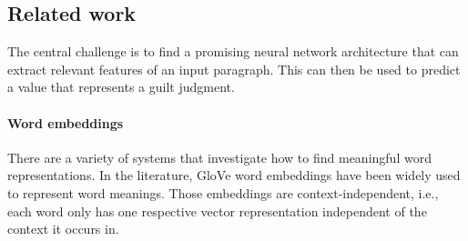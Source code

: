 \documentclass[11pt,a4paper]{article}
\begin{document}



\subsection{Related work}

The central challenge is to find a promising neural network architecture that can extract relevant features of an input paragraph. This can then be used to predict a value that represents a guilt judgment.

\paragraph{Word embeddings}
There are a variety of systems that investigate how to find meaningful word representations. In the literature, GloVe word embeddings \citep{Pennington:2014} have been widely used to represent word meanings. Those embeddings are context-independent, i.e., each word only has one respective vector representation independent of the context it occurs in.
\end{document}
